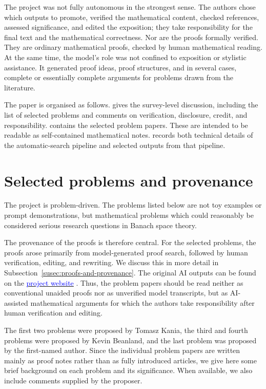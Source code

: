 \documentclass[11pt,reqno]{amsart}
\theoremstyle{plain}
\theoremstyle{definition}
\newcommand{\websiteurl}{https://mathematical-discoveries-in-the-wild.github.io/}
\newcommand{\website}[1][project website]{%
  \href{\websiteurl}{\textcolor{blue}{#1}}%
}
\begin{document}
The project was not fully autonomous in the strongest sense.  The authors chose which outputs to promote, verified the mathematical content, checked references, assessed significance, and edited the exposition; they take responsibility for the final text and the mathematical correctness. Nor are the proofs formally verified.  They are ordinary mathematical proofs, checked by human mathematical reading. At the same time, the model's role was not confined to exposition or stylistic assistance. It generated proof ideas, proof structures, and in several cases, complete or essentially complete arguments for problems drawn from the literature.

The paper is organised as follows.  gives the survey-level discussion, including the list of selected problems and comments on verification, disclosure, credit, and responsibility.   contains the selected problem papers. These are intended to be readable as self-contained mathematical notes.  records both technical details of the automatic-search pipeline and selected outputs from that pipeline.

\section{Selected problems and provenance}
\label{sec:problems-and-provenance}

The project is problem-driven. The problems listed below are not toy examples or prompt demonstrations, but mathematical problems which could reasonably be considered serious research questions in Banach space theory.


The provenance of the proofs is therefore central. For the selected problems, the proofs arose primarily from model-generated proof search, followed by human verification, editing, and rewriting. We discuss this in more detail in Subsection~\ref{susec:proofs-and-provenance}. The original AI outputs can be found on the \website[project website]. Thus, the problem papers should be read neither as conventional unaided proofs nor as unverified model transcripts, but as AI-assisted mathematical arguments for which the authors take responsibility after human verification and editing.

The first two problems were proposed by Tomasz Kania, the third and fourth problems were proposed by Kevin Beanland, and the last problem was proposed by the first-named author. Since the individual problem papers are written mainly as proof notes rather than as fully introduced articles, we give here some brief background on each problem and its significance. When available, we also include comments supplied by the proposer.
\end{document}
